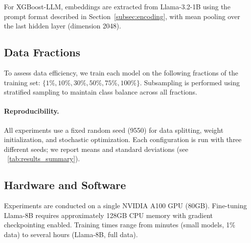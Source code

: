 \documentclass{article}
\theoremstyle{plain}
\theoremstyle{definition}
\theoremstyle{remark}
\begin{document}
For XGBoost-LLM, embeddings are extracted from Llama-3.2-1B using the prompt format described in Section~\ref{subsec:encoding}, with mean pooling over the last hidden layer (dimension 2048).

\subsection{Data Fractions}
\label{appendix:fractions}

To assess data efficiency, we train each model on the following fractions of the training set: $\{1\%, 10\%, 30\%, 50\%, 75\%, 100\%\}$. Subsampling is performed using stratified sampling to maintain class balance across all fractions.

\paragraph{Reproducibility.}
All experiments use a fixed random seed (9550) for data splitting, weight initialization, and stochastic optimization. Each configuration is run with three different seeds; we report means and standard deviations (see ~\ref{tab:results_summary}).

\subsection{Hardware and Software}
\label{appendix:hardware}

Experiments are conducted on a single NVIDIA A100 GPU (80GB). Fine-tuning Llama-8B requires approximately 128GB CPU memory with gradient checkpointing enabled. Training times range from minutes (small models, 1\% data) to several hours (Llama-8B, full data).
\end{document}
